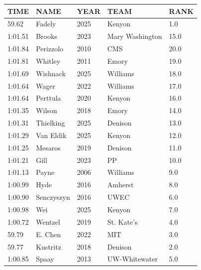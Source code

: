 \begin{table}[H]
\begin{minipage}[t]{0.48\textwidth}
\begin{tabular}{@{}p{1.8cm}p{2.8cm}p{1.2cm}p{1.4cm}p{0.8cm}@{}}
\hline
    \textbf{TIME} & \textbf{NAME} & \textbf{YEAR} & \textbf{TEAM} & \textbf{RANK} \\
\hline
    59.62 & Fadely & 2025 & Kenyon & 1.0 \\
    1:01.51 & Brooks & 2023 & Mary Washington & 15.0 \\
    1:01.84 & Perizzolo & 2010 & CMS & 20.0 \\
    1:01.81 & Whitley & 2011 & Emory & 19.0 \\
    1:01.69 & Wishnack & 2025 & Williams & 18.0 \\
    1:01.64 & Wager & 2022 & Williams & 17.0 \\
    1:01.64 & Perttula & 2020 & Kenyon & 16.0 \\
    1:01.35 & Wilson & 2018 & Emory & 14.0 \\
    1:01.31 & Thielking & 2025 & Denison & 13.0 \\
    1:01.29 & Van Eldik & 2025 & Kenyon & 12.0 \\
    1:01.25 & Mesaros & 2019 & Denison & 11.0 \\
    1:01.21 & Gill & 2023 & PP & 10.0 \\
    1:01.13 & Payne & 2006 & Williams & 9.0 \\
    1:00.99 & Hyde & 2016 & Amherst & 8.0 \\
    1:00.90 & Senczyszyn & 2016 & UWEC & 6.0 \\
    1:00.98 & Wei & 2025 & Kenyon & 7.0 \\
    1:00.72 & Wentzel & 2019 & St. Kate's & 4.0 \\
    59.79 & E. Chen & 2022 & MIT & 3.0 \\
    59.77 & Kustritz & 2018 & Denison & 2.0 \\
    1:00.85 & Spaay & 2013 & UW-Whitewater & 5.0 \\
\hline
\end{tabular}
\end{minipage}
\end{table}

